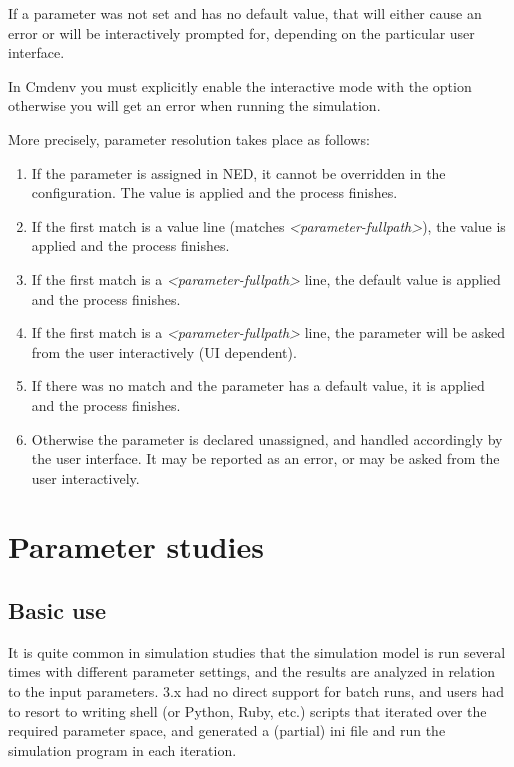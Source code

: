 If a parameter was not set and has no default value, that will either
cause an error or will be interactively prompted for, depending
on the particular user interface.

\begin{note}
In Cmdenv you must explicitly enable the interactive mode with the
 option otherwise you will get an error
when running the simulation.
\end{note}

More precisely, parameter resolution takes place as follows:

\begin{enumerate}
\item If the parameter is assigned in NED, it cannot be overridden in the
    configuration. The value is applied and the process finishes.
\item If the first match is a value line (matches \textit{<parameter-fullpath>}),
    the value is applied and the process finishes.
\item If the first match is a \textit{<parameter-fullpath>} line,
    the default value is applied and the process finishes.
\item If the first match is a \textit{<parameter-fullpath>} line,
    the parameter will be asked from the user interactively (UI dependent).
\item If there was no match and the parameter has a default value, it is applied
    and the process finishes.
\item Otherwise the parameter is declared unassigned, and handled accordingly
    by the user interface. It may be reported as an error, or may be
    asked from the user interactively.
\end{enumerate}


\section{Parameter studies}

\subsection{Basic use}


It is quite common in simulation studies that the simulation model is
run several times with different parameter settings, and the results
are analyzed in relation to the input parameters. {\opp} 3.x had no
direct support for batch runs, and users had to resort to writing shell
(or Python, Ruby, etc.) scripts that iterated over the required
parameter space, and generated a (partial) ini file and run the
simulation program in each iteration.

